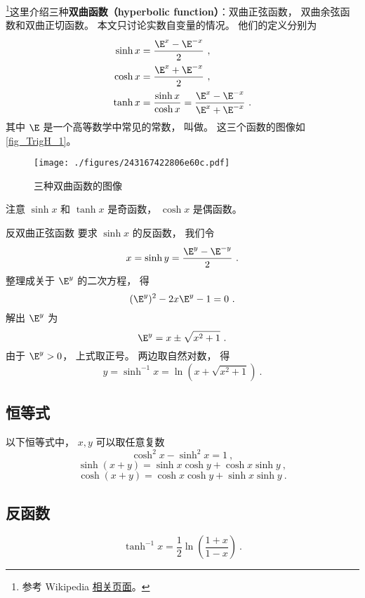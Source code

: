 

\footnote{参考 Wikipedia \href{https://en.wikipedia.org/wiki/Hyperbolic_functions}{相关页面}。}这里介绍三种\textbf{双曲函数（hyperbolic function）}：双曲正弦函数， 双曲余弦函数和双曲正切函数。 本文只讨论实数自变量的情况。 他们的定义分别为
\begin{align}
\sinh x &= \frac{\E^x - \E^{-x}}{2}~,\\
\label{eq_TrigH_1}
\cosh x &= \frac{\E^x + \E^{-x}}{2}~,\\
\tanh x &= \frac{\sinh x}{\cosh x} = \frac{\E^x - \E^{-x}}{\E^x + \E^{-x}}~.
\end{align}
其中 $\E$ 是一个高等数学中常见的常数， 叫做。 这三个函数的图像如\autoref{fig_TrigH_1}。

\begin{figure}[ht]
\centering
\texttt{[image: ./figures/243167422806e60c.pdf]}
\caption{三种双曲函数的图像} \label{fig_TrigH_1}
\end{figure}

注意 $\sinh x$ 和 $\tanh x$ 是奇函数， $\cosh x$ 是偶函数。

\begin{example}{反双曲正弦函数}\label{ex_TrigH_1}
要求 $\sinh x$ 的反函数， 我们令
\begin{equation}
x = \sinh y =  \frac{\E^y - \E^{-y}}{2}~.
\end{equation}
整理成关于 $\E^y$ 的二次方程， 得
\begin{equation}
(\E^y)^2 - 2x \E^y - 1 = 0~.
\end{equation}
解出 $\E^y$ 为
\begin{equation}
\E^y = x \pm \sqrt{x^2 + 1}~.
\end{equation}
由于 $\E^y > 0$， 上式取正号。 两边取自然对数， 得
\begin{equation}
y = \sinh^{-1} x = \ln(x + \sqrt{x^2 + 1})~.
\end{equation}
\end{example}

\subsection{恒等式}
以下恒等式中， $x,y$ 可以取任意复数
\begin{equation}
\cosh^2 x - \sinh^2 x = 1~,
\end{equation}
\begin{equation}
\sinh(x+y) = \sinh x \cosh y + \cosh x \sinh y~,
\end{equation}
\begin{equation}
\cosh(x+y) = \cosh x \cosh y + \sinh x \sinh y~.
\end{equation}

\subsection{反函数}

\begin{equation}\label{eq_atanh}
\tanh^{-1} x = \frac12 \ln(\frac{1+x}{1-x})~.
\end{equation}
